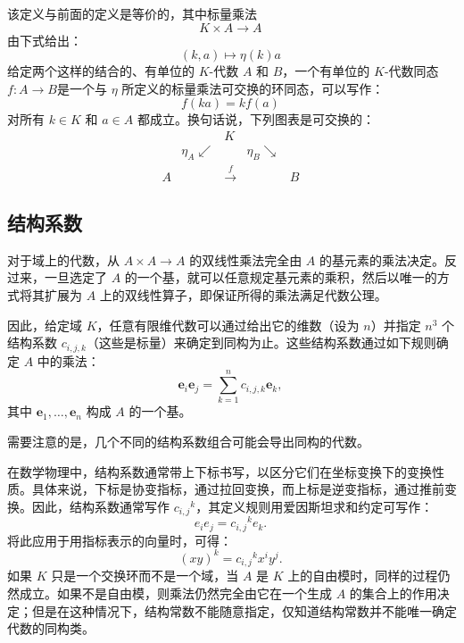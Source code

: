 该定义与前面的定义是等价的，其中标量乘法
$$
K \times A \to A~
$$
由下式给出：
$$
(k, a) \mapsto \eta(k)a~
$$
给定两个这样的结合的、有单位的 $K$-代数 $A$ 和 $B$，一个有单位的 $K$-代数同态$f : A \to B$是一个与 $\eta$ 所定义的标量乘法可交换的环同态，可以写作：
$$
f(ka) = k f(a)~
$$
对所有 $k \in K$ 和 $a \in A$ 都成立。换句话说，下列图表是可交换的：
$$
\begin{matrix}
& & K & & \\
& \eta_A \swarrow & & \eta_B \searrow & \\
A & & \xrightarrow{f} & & B
\end{matrix}~
$$
\subsection{结构系数}
对于域上的代数，从 $A \times A \to A$ 的双线性乘法完全由 $A$ 的基元素的乘法决定。反过来，一旦选定了 $A$ 的一个基，就可以任意规定基元素的乘积，然后以唯一的方式将其扩展为 $A$ 上的双线性算子，即保证所得的乘法满足代数公理。

因此，给定域 $K$，任意有限维代数可以通过给出它的维数（设为 $n$）并指定 $n^3$ 个结构系数 $c_{i,j,k}$（这些是标量）来确定到同构为止。这些结构系数通过如下规则确定 $A$ 中的乘法：
$$
\mathbf{e}_i \mathbf{e}_j = \sum_{k=1}^{n} c_{i,j,k} \mathbf{e}_k,~
$$
其中 $\mathbf{e}_1, \ldots, \mathbf{e}_n$ 构成 $A$ 的一个基。

需要注意的是，几个不同的结构系数组合可能会导出同构的代数。

在数学物理中，结构系数通常带上下标书写，以区分它们在坐标变换下的变换性质。具体来说，下标是协变指标，通过拉回变换，而上标是逆变指标，通过推前变换。因此，结构系数通常写作 $c_{i,j}{}^{k}$，其定义规则用爱因斯坦求和约定可写作：
$$
e_i e_j = c_{i,j}{}^{k} e_k.~
$$
将此应用于用指标表示的向量时，可得：
$$
(xy)^k = c_{i,j}{}^{k} x^i y^j.~
$$
如果 $K$ 只是一个交换环而不是一个域，当 $A$ 是 $K$ 上的自由模时，同样的过程仍然成立。如果不是自由模，则乘法仍然完全由它在一个生成 $A$ 的集合上的作用决定；但是在这种情况下，结构常数不能随意指定，仅知道结构常数并不能唯一确定代数的同构类。
